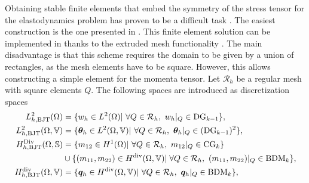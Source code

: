 Obtaining stable finite elements that embed the symmetry of the stress tensor for the elastodynamics problem has proven to be a difficult task \cite{arnold2002mixed}. The easiest construction is the one presented in \cite{becache2001elas}. This finite element solution can be implemented in {} \cite{rathgeber2017firedrake} thanks to the extruded mesh functionality \cite{mcrae2016}.  The main disadvantage is that this scheme requires the domain to be given by a union of rectangles, as the mesh elements have to be square. However, this allows constructing a simple element for the momenta tensor. Let $\mathcal{R}_h$ be a regular mesh with square elements $Q$. The following spaces are introduced as discretization spaces
\begin{equation}
\label{eq:BTJ}
\begin{aligned}
L_{h, \text{BJT}}^2(\Omega) &= \{w_h \in L^2(\Omega) | \ \forall Q \in \mathcal{R}_h, \ w_h|_{Q} \in \mathrm{DG}_{k-1} \}, \\
L_{h, \text{BJT}}^2(\Omega, \mathbb{V}) &= \{\bm{\theta}_h \in L^2(\Omega, \mathbb{V}) | \ \forall Q \in \mathcal{R}_h,\ \bm{\theta}_h|_{Q} \in (\mathrm{DG}_{k-1})^2 \}, \\
H_{h, \text{BJT}}^{\Div}(\Omega, \mathbb{S}) &= \{m_{12} \in H^1(\Omega)| \ \forall Q \in \mathcal{R}_h,\ m_{12}|_{Q} \in \mathrm{CG}_{k} \}  \\
&\cup \{(m_{11}, m_{22}) \in H^{\div}(\Omega, \mathbb{V})| \; \forall Q\in \mathcal{R}_h,\ (m_{11}, m_{22})|_{Q} \in \mathrm{BDM}_{k} \}, \\
H_{h, \text{BJT}}^{\div}(\Omega, \mathbb{V}) &= \{\bm{q}_h \in H^{\div}(\Omega, \mathbb{V}) | \ \forall Q\in \mathcal{R}_h,\ \bm{q}_h|_{Q} \in \mathrm{BDM}_{k} \}, \\ 
\end{aligned}
\end{equation}

